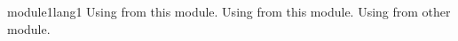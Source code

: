 \begin{mhmodnl}[creators=marian]{module1}{lang1}
    Using  from this module.
    Using  from this module.
    Using  from other module.
\end{mhmodnl}